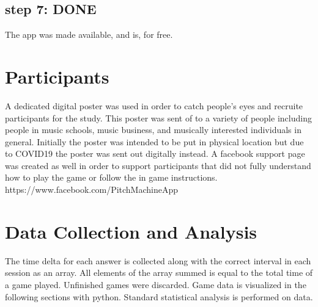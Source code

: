 \subsection{step 7: DONE}
The app was made available, and is, for free.

\section{Participants}
A dedicated digital poster was used in order to catch people's eyes and recruite participants for the study. This poster was sent of to a variety of people including people in music schools, music business, and musically interested individuals in general. Initially the poster was intended to be put in physical location but due to COVID19 the poster was sent out digitally instead.
A facebook support page was created as well in order to support participants that did not fully understand how to play the game
or follow the in game instructions. https://www.facebook.com/PitchMachineApp


\section{Data Collection and Analysis}
The time delta for each answer is collected along with the correct interval in each session as an array. All elements of the array summed is equal to the total time of a game played. Unfinished games were discarded. Game data is visualized in the following sections with python. Standard statistical analysis is performed on data.



